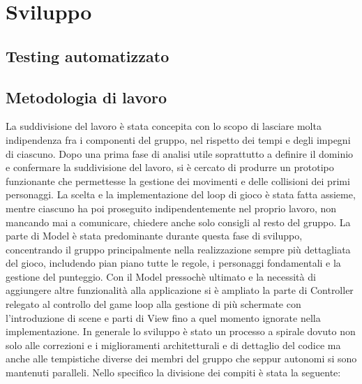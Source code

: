 \documentclass[a4paper,12pt, hidelinks]{report}
\begin{document}
\chapter{Sviluppo}
\section{Testing automatizzato}


\section{Metodologia di lavoro}

La suddivisione del lavoro è stata concepita con lo scopo di lasciare molta indipendenza fra i componenti del gruppo, nel rispetto dei tempi e degli impegni di ciascuno. Dopo una prima fase di analisi utile soprattutto a definire il dominio e confermare la suddivisione del lavoro, si è cercato di produrre un prototipo funzionante che permettesse la gestione dei movimenti e delle collisioni dei primi personaggi. La scelta e la implementazione del loop di gioco è stata fatta assieme, mentre ciascuno ha poi proseguito indipendentemente nel proprio lavoro, non mancando mai a comunicare, chiedere anche solo consigli al resto del gruppo. La parte di Model è stata predominante durante questa fase di sviluppo, concentrando il gruppo principalmente nella realizzazione sempre più dettagliata del gioco, includendo pian piano tutte le regole, i personaggi fondamentali e la gestione del punteggio. Con il Model pressochè ultimato e la necessità di aggiungere altre funzionalità alla applicazione si è ampliato la parte di Controller relegato al controllo del game loop alla gestione di più schermate con l'introduzione di scene e parti di View fino a quel momento ignorate nella implementazione. In generale lo sviluppo è stato un processo a spirale dovuto non solo alle correzioni e i miglioramenti architetturali e di dettaglio del codice ma anche alle tempistiche diverse dei membri del gruppo che seppur autonomi si sono mantenuti paralleli.
Nello specifico la divisione dei compiti è stata la seguente:
\end{document}
